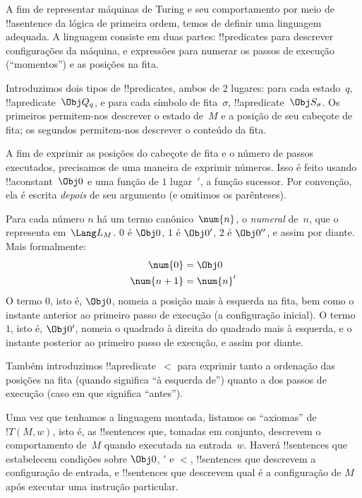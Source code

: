 \documentclass[../../../include/open-logic-section]{subfiles}
\begin{document}

\begin{explain}
A fim de representar máquinas de Turing e seu comportamento por meio de
!!a{sentence} da lógica de primeira ordem, temos de definir uma
linguagem adequada. A linguagem consiste em duas partes: !!{predicate}s
para descrever configurações da máquina, e expressões para numerar os
passos de execução (``momentos'') e as posições na fita.

Introduzimos dois tipos de !!{predicate}s, ambos de 2 lugares: para
cada estado~$q$, !!a{predicate}~$\Obj Q_q$, e para cada símbolo de
fita~$\sigma$, !!a{predicate}~$\Obj S_\sigma$. Os primeiros
permitem-nos descrever o estado de~$M$ e a posição de seu cabeçote de
fita; os segundos permitem-nos descrever o conteúdo da fita.

A fim de exprimir as posições do cabeçote de fita e o número de passos
executados, precisamos de uma maneira de exprimir números. Isso é
feito usando !!a{constant}~$\Obj 0$ e uma função de $1$ lugar~$\prime$,
a função sucessor. Por convenção, ela é escrita \emph{depois} de seu
argumento (e omitimos os parênteses).

Para cada número $n$ há um termo canônico~$\num{n}$, o \emph{numeral}
de~$n$, que o representa em~$\Lang L_M$. $\num{0}$ é $\Obj 0$, $\num{1}$
é $\Obj 0'$, $\num{2}$ é $\Obj 0''$, e assim por diante. Mais
formalmente:
\begin{align*}
\num{0} & = \Obj 0 \\
\num{n+1} &= \num{n}'
\end{align*}
O termo $\num{0}$, isto é, $\Obj 0$, nomeia a posição mais à esquerda
na fita, bem como o instante anterior ao primeiro passo de execução (a
configuração inicial). O termo $\num{1}$, isto é, $\Obj 0'$, nomeia o
quadrado à direita do quadrado mais à esquerda, e o instante posterior
ao primeiro passo de execução, e assim por diante.

Também introduzimos !!a{predicate}~$<$ para exprimir tanto a ordenação
das posições na fita (quando significa ``à esquerda de'') quanto a dos
passos de execução (caso em que significa ``antes'').

Uma vez que tenhamos a linguagem montada, listamos os ``axiomas'' de
$!T(M, w)$, isto é, as !!{sentence}s que, tomadas em conjunto,
descrevem o comportamento de~$M$ quando executada na entrada~$w$.
Haverá !!{sentence}s que estabelecem condições sobre $\Obj 0$,
$\prime$ e $<$, !!{sentence}s que descrevem a configuração de entrada,
e !!{sentence}s que descrevem qual é a configuração de $M$ após
executar uma instrução particular.
\end{explain}
\end{document}
